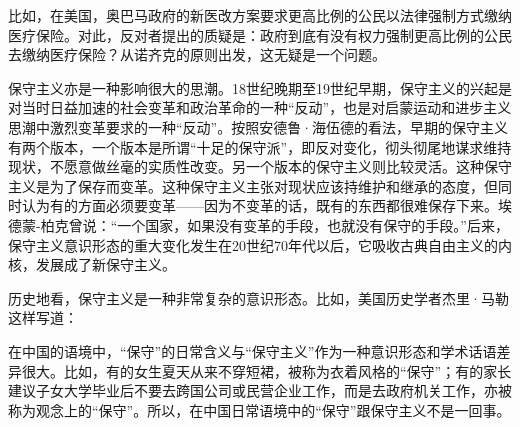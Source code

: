 
比如，在美国，奥巴马政府的新医改方案要求更高比例的公民以法律强制方式缴纳医疗保险。对此，反对者提出的质疑是：政府到底有没有权力强制更高比例的公民去缴纳医疗保险？从诺齐克的原则出发，这无疑是一个问题。


保守主义亦是一种影响很大的思潮。18世纪晚期至19世纪早期，保守主义的兴起是对当时日益加速的社会变革和政治革命的一种“反动”，也是对启蒙运动和进步主义思潮中激烈变革要求的一种“反动”。按照安德鲁·海伍德的看法，早期的保守主义有两个版本，一个版本是所谓“十足的保守派”，即反对变化，彻头彻尾地谋求维持现状，不愿意做丝毫的实质性改变。另一个版本的保守主义则比较灵活。这种保守主义是为了保存而变革。这种保守主义主张对现状应该持维护和继承的态度，但同时认为有的方面必须要变革——因为不变革的话，既有的东西都很难保存下来。埃德蒙-柏克曾说：“一个国家，如果没有变革的手段，也就没有保守的手段。”后来，保守主义意识形态的重大变化发生在20世纪70年代以后，它吸收古典自由主义的内核，发展成了新保守主义。

历史地看，保守主义是一种非常复杂的意识形态。比如，美国历史学者杰里·马勒这样写道：


在中国的语境中，“保守”的日常含义与“保守主义”作为一种意识形态和学术话语差异很大。比如，有的女生夏天从来不穿短裙，被称为衣着风格的“保守”；有的家长建议子女大学毕业后不要去跨国公司或民营企业工作，而是去政府机关工作，亦被称为观念上的“保守”。所以，在中国日常语境中的“保守”跟保守主义不是一回事。

